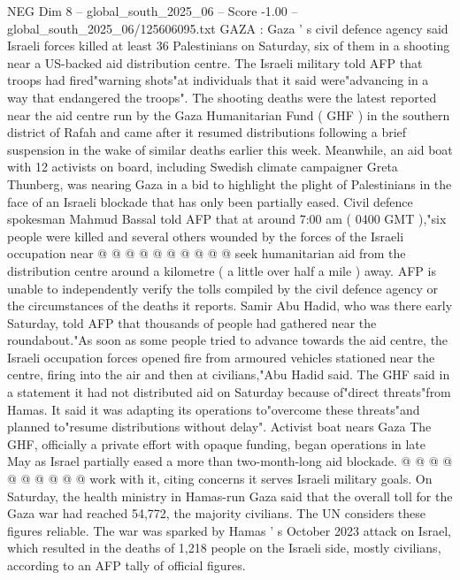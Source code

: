 \begin{textsample}{NEG Dim 8 – global\_south\_2025\_06 – Score -1.00 – global\_south\_2025\_06/125606095.txt}  \label{ex:f8_neg_251}
GAZA : Gaza ' s civil defence agency said Israeli forces killed at least 36 Palestinians on Saturday, six of them in a shooting near a US-backed aid distribution centre.
The Israeli military told AFP that troops had fired"warning shots"at individuals that it said were"advancing in a way that endangered the troops".
The shooting deaths were the latest reported near the aid centre run by the Gaza Humanitarian Fund ( GHF ) in the southern district of Rafah and came after it resumed distributions following a brief suspension in the wake of similar deaths earlier this week.
Meanwhile, an aid boat with 12 activists on board, including Swedish climate campaigner Greta Thunberg, was nearing Gaza in a bid to highlight the plight of Palestinians in the face of an Israeli blockade that has only been partially eased.
Civil defence spokesman Mahmud Bassal told AFP that at around 7:00 am ( 0400 GMT ),"six people were killed and several others wounded by the forces of the Israeli occupation near @ @ @ @ @ @ @ @ @ @ seek humanitarian aid from the distribution centre around a kilometre ( a little over half a mile ) away.
AFP is unable to independently verify the tolls compiled by the civil defence agency or the circumstances of the deaths it reports.
Samir Abu Hadid, who was there early Saturday, told AFP that thousands of people had gathered near the roundabout."As soon as some people tried to advance towards the aid centre, the Israeli occupation forces opened fire from armoured vehicles stationed near the centre, firing into the air and then at civilians,"Abu Hadid said.
The GHF said in a statement it had not distributed aid on Saturday because of"direct threats"from Hamas.
It said it was adapting its operations to"overcome these threats"and planned to"resume distributions without delay".
Activist boat nears Gaza The GHF, officially a private effort with opaque funding, began operations in late May as Israel partially eased a more than two-month-long aid blockade. @ @ @ @ @ @ @ @ @ @ work with it, citing concerns it serves Israeli military goals.
On Saturday, the health ministry in Hamas-run Gaza said that the overall toll for the Gaza war had reached 54,772, the majority civilians.
The UN considers these figures reliable.
The war was sparked by Hamas ' s October 2023 attack on Israel, which resulted in the deaths of 1,218 people on the Israeli side, mostly civilians, according to an AFP tally of official figures.

\end{textsample}
